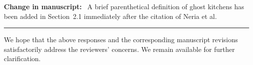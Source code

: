 \documentclass[12pt]{article}
\newcommand{\change}{\noindent\textbf{Change in manuscript:}\ }
\begin{document}
\change
A brief parenthetical definition of ghost kitchens has been added
in Section~2.1 immediately after the citation of Neria et al.

\bigskip
\hrule
\bigskip

\noindent
We hope that the above responses and the corresponding manuscript
revisions satisfactorily address the reviewers' concerns.
We remain available for further clarification.
\end{document}
